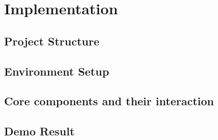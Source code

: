 \chapter{Implementation}

\section{Project Structure}

\section{Environment Setup}

\section{Core components and their interaction}

\section{Demo Result}
